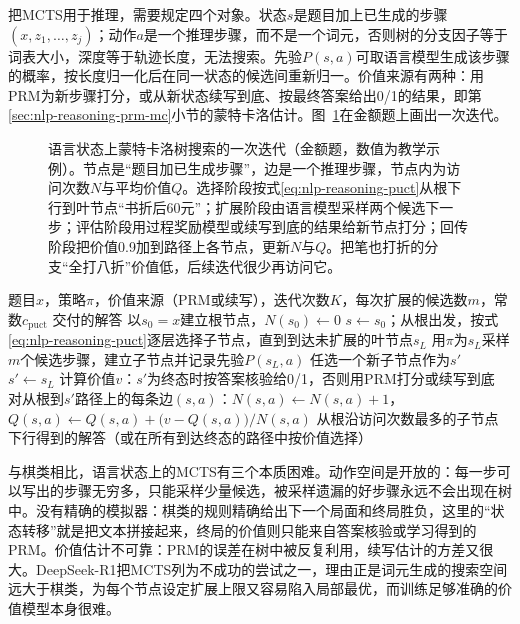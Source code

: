 把MCTS用于推理，需要规定四个对象。状态$s$是题目加上已生成的步骤$(x,z_1,\ldots,z_j)$；动作$a$是一个推理步骤，而不是一个词元，否则树的分支因子等于词表大小，深度等于轨迹长度，无法搜索。先验$P(s,a)$可取语言模型生成该步骤的概率，按长度归一化后在同一状态的候选间重新归一。价值来源有两种：用PRM为新步骤打分，或从新状态续写到底、按最终答案给出0/1的结果，即第\ref{sec:nlp-reasoning-prm-mc}小节的蒙特卡洛估计。图~\ref{fig:nlp-reasoning-mcts}在金额题上画出一次迭代。

\begin{figure}[!t]
  \centering
  
  \caption{语言状态上蒙特卡洛树搜索的一次迭代（金额题，数值为教学示例）。节点是“题目加已生成步骤”，边是一个推理步骤，节点内为访问次数$N$与平均价值$Q$。选择阶段按式\eqref{eq:nlp-reasoning-puct}从根下行到叶节点“书折后60元”；扩展阶段由语言模型采样两个候选下一步；评估阶段用过程奖励模型或续写到底的结果给新节点打分；回传阶段把价值0.9加到路径上各节点，更新$N$与$Q$。把笔也打折的分支“全打八折”价值低，后续迭代很少再访问它。}
  \label{fig:nlp-reasoning-mcts}
\end{figure}

\begin{algorithm}[语言状态上的蒙特卡洛树搜索]
  \label{alg:nlp-reasoning-mcts}
  \begin{algorithmic}[1]
    \Require 题目$x$，策略$\pi$，价值来源（PRM或续写），迭代次数$K$，每次扩展的候选数$m$，常数$c_{\mathrm{puct}}$
    \Ensure 交付的解答
    \State 以$s_0=x$建立根节点，$N(s_0)\gets0$
      \State $s\gets s_0$；从根出发，按式\eqref{eq:nlp-reasoning-puct}逐层选择子节点，直到到达未扩展的叶节点$s_L$ 
        \State 用$\pi$为$s_L$采样$m$个候选步骤，建立子节点并记录先验$P(s_L,a)$ 
        \State 任选一个新子节点作为$s'$
      \Else
        \State $s'\gets s_L$
      \EndIf
      \State 计算价值$v$：$s'$为终态时按答案核验给0/1，否则用PRM打分或续写到底 
      \State 对从根到$s'$路径上的每条边$(s,a)$：$N(s,a)\gets N(s,a)+1$，$Q(s,a)\gets Q(s,a)+\bigl(v-Q(s,a)\bigr)/N(s,a)$ 
    \EndFor
    \State \Return 从根沿访问次数最多的子节点下行得到的解答（或在所有到达终态的路径中按价值选择）
  \end{algorithmic}
\end{algorithm}

与棋类相比，语言状态上的MCTS有三个本质困难。动作空间是开放的：每一步可以写出的步骤无穷多，只能采样少量候选，被采样遗漏的好步骤永远不会出现在树中。没有精确的模拟器：棋类的规则精确给出下一个局面和终局胜负，这里的“状态转移”就是把文本拼接起来，终局的价值则只能来自答案核验或学习得到的PRM。价值估计不可靠：PRM的误差在树中被反复利用，续写估计的方差又很大。DeepSeek-R1把MCTS列为不成功的尝试之一，理由正是词元生成的搜索空间远大于棋类，为每个节点设定扩展上限又容易陷入局部最优，而训练足够准确的价值模型本身很难。

